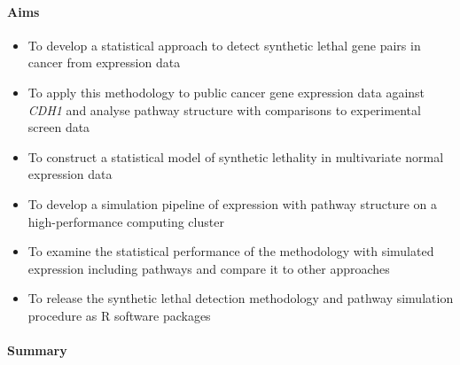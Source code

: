\iffalse
\clearpage
\paragraph{Aims}

  \begin{itemize}
   \item To develop a statistical approach to detect synthetic lethal gene pairs in cancer from expression data

   \bigskip
   
   \item To apply this methodology to public cancer gene expression data against \textit{CDH1} and analyse pathway structure with comparisons to experimental screen data

   \bigskip
   
   \item To construct a statistical model of synthetic lethality in multivariate normal expression data
 
   \bigskip
   
   \item To develop a simulation pipeline of expression with pathway structure on a high-performance computing cluster 

   \bigskip
   
   \item To examine the statistical performance of the methodology with simulated expression including pathways and compare it to other approaches

   \bigskip
   
   \item To release the synthetic lethal detection methodology and pathway simulation procedure as R software packages
   
  \end{itemize}
  

\clearpage
  
 \paragraph{Summary}
 

